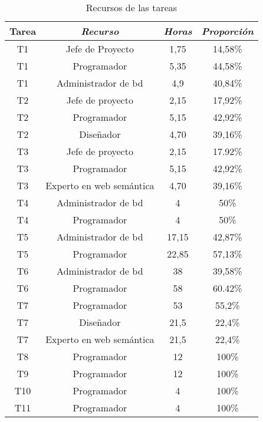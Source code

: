\begin{table}[htp]
	\centering
	\caption{Recursos de las tareas}\label{tab:recursos}
	\begin{tabular}{cccc}
		\toprule
		\textbf{Tarea} & \emph{Recurso} & \emph{Horas} & \emph{Proporción}\\
		\midrule
		T1 & Jefe de Proyecto & 1,75 & 14,58\%\\
		T1 & Programador & 5,35 & 44,58\%\\
		T1 & Administrador de \acrshort{bd} & 4,9 & 40,84\%\\
		T2 & Jefe de proyecto & 2,15 & 17,92\%\\
		T2 & Programador & 5,15 & 42,92\%\\
		T2 & Diseñador & 4,70 & 39,16\%\\
		T3 & Jefe de proyecto & 2,15 & 17.92\%\\
		T3 & Programador & 5,15 & 42,92\%\\
		T3 & Experto en web semántica & 4,70 & 39,16\%\\
		T4 & Administrador de \acrshort{bd} & 4 & 50\%\\
		T4 & Programador & 4 & 50\%\\
		T5 & Administrador de \acrshort{bd} & 17,15 & 42,87\%\\
		T5 & Programador & 22,85 & 57,13\%\\
		T6 & Administrador de \acrshort{bd} & 38 & 39,58\%\\
		T6 & Programador & 58 & 60.42\%\\
		T7 & Programador & 53 & 55,2\%\\
		T7 & Diseñador & 21,5 & 22,4\%\\
		T7 & Experto en web semántica & 21,5 & 22,4\%\\
		T8 & Programador & 12 & 100\%\\
		T9 & Programador & 12 & 100\%\\
		T10 & Programador & 4 & 100\%\\
		T11 & Programador & 4 & 100\%\\
		\bottomrule
    \end{tabular}
\end{table}